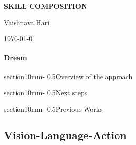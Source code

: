 \documentclass[11pt,a4paper]{article}
\makeatletter
\renewcommand{\section}{\@startsection%
{section}{1}{0mm}{-\baselineskip}%
{0.5\baselineskip}{\normalfont\Large\bfseries}}%
\makeatother
\begin{document}
\pagestyle{plain}



\begin{center} 
\bfseries\uppercase{Skill composition}
\end{center}
\vspace{-0.3cm}
\centerline{{Vaishnava Hari}}
\centerline{\today}


\paragraph{Dream}
    

\section{Overview of the approach}
    

\section{Next steps}
    
\section{Previous Works}

    \subsection{Vision-Language-Action}
        



%     

%     

%     



\end{document}
